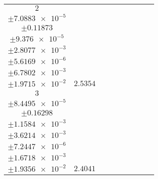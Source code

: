 \documentclass[8pt]{article}
\begin{document}
\begin{longtable}[l]{c c c c c c c c c}
$\num{2}$ & \begin{tabular}[c]{@{}c@{}}$\num{3.1298e-2}$ \\ $\pm\num{7.0883e-5}$\end{tabular} & \begin{tabular}[c]{@{}c@{}}$\num{-0.32622}$ \\ $\pm\num{0.11873}$\end{tabular} & \begin{tabular}[c]{@{}c@{}}$\num{-7.4872}$ \\ $\pm\num{9.376e-5}$\end{tabular} & \begin{tabular}[c]{@{}c@{}}$\num{1.8503e+3}$ \\ $\pm\num{2.8077e-3}$\end{tabular} & \begin{tabular}[c]{@{}c@{}}$\num{3.7016}$ \\ $\pm\num{5.6169e-6}$\end{tabular} & \begin{tabular}[c]{@{}c@{}}$\num{1.1786}$ \\ $\pm\num{6.7802e-3}$\end{tabular} & \begin{tabular}[c]{@{}c@{}}$\num{4.08}$ \\ $\pm\num{1.9715e-2}$\end{tabular} & $\num{2.5354}$\\
$\num{3}$ & \begin{tabular}[c]{@{}c@{}}$\num{2.8543e-2}$ \\ $\pm\num{8.4495e-5}$\end{tabular} & \begin{tabular}[c]{@{}c@{}}$\num{-0.31296}$ \\ $\pm\num{0.16298}$\end{tabular} & \begin{tabular}[c]{@{}c@{}}$\num{-7.3087}$ \\ $\pm\num{1.1584e-3}$\end{tabular} & \begin{tabular}[c]{@{}c@{}}$\num{1.8505e+3}$ \\ $\pm\num{3.6214e-3}$\end{tabular} & \begin{tabular}[c]{@{}c@{}}$\num{3.7021}$ \\ $\pm\num{7.2447e-6}$\end{tabular} & \begin{tabular}[c]{@{}c@{}}$\num{1.1355}$ \\ $\pm\num{1.6718e-3}$\end{tabular} & \begin{tabular}[c]{@{}c@{}}$\num{4.1348}$ \\ $\pm\num{1.9356e-2}$\end{tabular} & $\num{2.4041}$\\

\end{longtable}
\end{document}
